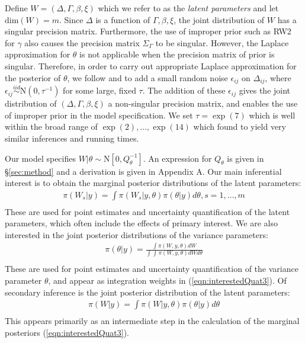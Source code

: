 \documentclass[ba]{imsart}
\begin{document}
Define $W = \left(\Delta, \Gamma,\beta, \xi \right)$ which we refer to as the \textit{latent parameters} and let $\text{dim}(W) = m$. Since $\Delta$ is a function of $\Gamma,\beta,\xi$, the joint distribution of $W$ has a singular precision matrix. Furthermore, the use of improper prior such as RW2 for $\gamma$ also causes the precision matrix $\Sigma_{\Gamma}$ to be singular. However, the Laplace approximation for $\theta$ is not applicable when the precision matrix of prior is singular. Therefore, in order to carry out appropriate Laplace approximation for the posterior of $\theta$, we follow \cite{inla} and \cite{casecross} to add a small random noise $\epsilon_{ij}$ on $\Delta_{ij}$,
where $\epsilon_{ij} \stackrel{iid}{\sim} \text{N}(0,\tau^{-1})$ for some large, fixed $\tau$. The addition of these $\epsilon_{ij}$ gives the joint distribution of $\left(\Delta, \Gamma,\beta, \xi \right)$ a non-singular precision matrix, and enables the use of improper prior in the model specification. We set $\tau = \exp(7)$ which is well within the broad range of $\exp(2),\ldots,\exp(14)$ which \cite{casecross} found to yield very similar inferences and running times. 


Our model specifies $W|\theta\sim\text{N}\left[ 0,Q^{-1}_{\theta}\right]$. An expression for $Q_{\theta}$ is given in \S\ref{sec:method} and a derivation is given in Appendix A. Our main inferential interest is to obtain the marginal posterior distributions of the latent parameters:
\begin{equation}\begin{aligned}\label{eqn:interestedQuat3}
\pi(W_{s}|y) = \int \pi(W_{s}|y,\theta) \pi(\theta|y) d\theta, s = 1,\ldots,m  \\
\end{aligned}\end{equation}
These are used for point estimates and uncertainty quantification of the latent parameters, which often include the effects of primary interest. We are also interested in the joint posterior distributions of the variance parameters:
\begin{equation}\begin{aligned}\label{eqn:interestedQuat1}
\pi(\theta|y) = \frac{\int \pi(W,y,\theta) dW}{\int_{} \int_{} \pi(W,y,\theta) dW d\theta } \\
\end{aligned}\end{equation}
These are used for point estimates and uncertainty quantification of the variance parameter $\theta$, and appear as integration weights in (\ref{eqn:interestedQuat3}). Of secondary inference is the joint posterior distribution of the latent parameters:
\begin{equation}\begin{aligned}\label{eqn:interestedQuat2}
\pi(W|y) = \int \pi(W|y,\theta) \pi(\theta|y) d\theta  \\
\end{aligned}\end{equation}
This appears primarily as an intermediate step in the calculation of the marginal posteriors (\ref{eqn:interestedQuat3}).
\end{document}
